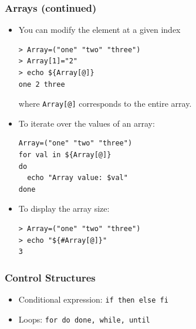 \documentclass{beamer}
\newenvironment{terminal}{\color{white}\begin{snugshade*}}
{\end{snugshade*}\color{black}}
\begin{document}
\begin{frame}[fragile]
  \frametitle{Arrays (continued)}
  \begin{itemize}
  \item  You can modify the element at a given index
      \begin{scriptsize}
  \begin{terminal}
\begin{verbatim}
> Array=("one" "two" "three")
> Array[1]="2"
> echo ${Array[@]}
one 2 three
\end{verbatim}
  \end{terminal}
    \end{scriptsize}
  where \texttt{Array[@]} corresponds to the entire array.
\item To iterate over the values of an array:
  \begin{scriptsize}
  \begin{terminal}
\begin{verbatim}
Array=("one" "two" "three")
for val in ${Array[@]}
do
  echo "Array value: $val"
done
\end{verbatim}
  \end{terminal}
  \end{scriptsize}
\item To display the array size:
      \begin{scriptsize}
  \begin{terminal}
\begin{verbatim}
> Array=("one" "two" "three")
> echo "${#Array[@]}"
3
\end{verbatim}
      \end{terminal}
        \end{scriptsize}
  \end{itemize}
\end{frame}


\begin{frame}[fragile]
\frametitle{Control Structures}
\begin{itemize}
\item Conditional expression: \verb|if then else fi|
\item Loops: \verb|for do done, while, until|
\end{itemize}
\end{frame}
\end{document}

